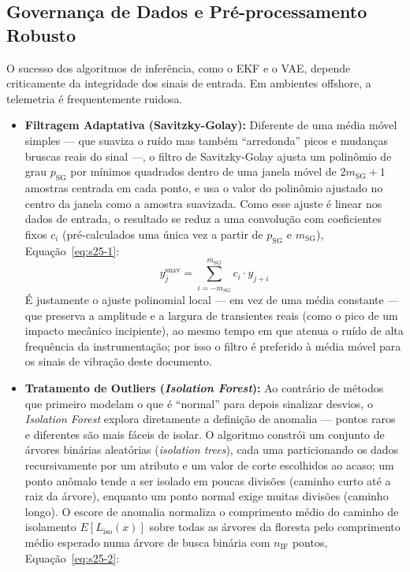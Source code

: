 \documentclass[12pt,a4paper]{article}
\numberwithin{equation}{section}
\numberwithin{table}{section}
\numberwithin{figure}{section}
\begin{document}
	\subsection{Governança de Dados e Pré-processamento Robusto}
	O sucesso dos algoritmos de inferência, como o EKF e o VAE, depende criticamente da integridade dos sinais de entrada. Em ambientes offshore, a telemetria é frequentemente ruidosa.
	\begin{itemize}
		\item \textbf{Filtragem Adaptativa (Savitzky-Golay):} Diferente de uma média móvel simples — que suaviza o ruído mas também ``arredonda'' picos e mudanças bruscas reais do sinal —, o filtro de Savitzky-Golay \cite{savgol} ajusta um polinômio de grau $p_{\text{SG}}$ por mínimos quadrados dentro de uma janela móvel de $2m_{\text{SG}}+1$ amostras centrada em cada ponto, e usa o valor do polinômio ajustado no centro da janela como a amostra suavizada. Como esse ajuste é linear nos dados de entrada, o resultado se reduz a uma convolução com coeficientes fixos $c_i$ (pré-calculados uma única vez a partir de $p_{\text{SG}}$ e $m_{\text{SG}}$), Equação~\eqref{eq:s25-1}:
		\begin{equation}\label{eq:s25-1}
 y_j^{\text{suav}} = \sum_{i=-m_{\text{SG}}}^{m_{\text{SG}}} c_i \cdotp y_{j+i}
\end{equation}
		É justamente o ajuste polinomial local — em vez de uma média constante — que preserva a amplitude e a largura de transientes reais (como o pico de um impacto mecânico incipiente), ao mesmo tempo em que atenua o ruído de alta frequência da instrumentação; por isso o filtro é preferido à média móvel para os sinais de vibração deste documento.
		\item \textbf{Tratamento de Outliers (\textit{Isolation Forest}):} Ao contrário de métodos que primeiro modelam o que é ``normal'' para depois sinalizar desvios, o \textit{Isolation Forest} \cite{isoforest} explora diretamente a definição de anomalia — pontos raros e diferentes são mais fáceis de isolar. O algoritmo constrói um conjunto de árvores binárias aleatórias (\textit{isolation trees}), cada uma particionando os dados recursivamente por um atributo e um valor de corte escolhidos ao acaso; um ponto anômalo tende a ser isolado em poucas divisões (caminho curto até a raiz da árvore), enquanto um ponto normal exige muitas divisões (caminho longo). O escore de anomalia normaliza o comprimento médio do caminho de isolamento $E[L_{\text{iso}}(x)]$ sobre todas as árvores da floresta pelo comprimento médio esperado numa árvore de busca binária com $n_{\text{IF}}$ pontos, Equação~\eqref{eq:s25-2}:

\end{itemize}
\end{document}
